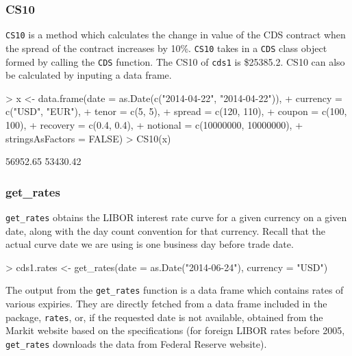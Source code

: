 \documentclass{jss}
\renewenvironment{Schunk}{\vspace{\topsep}}{\vspace{\topsep}}
\begin{document}
\subsubsection{CS10}


\texttt{CS10} is a method which calculates the change in value of the CDS contract when the spread of the contract increases by 10\%. \texttt{CS10} takes in a \texttt{CDS} class object formed by calling the \texttt{CDS} function. The CS10 of \texttt{cds1} is \$25385.2. CS10 can also be calculated by inputing a data frame. 

\begin{Schunk}
\begin{Sinput}
> x <- data.frame(date = as.Date(c("2014-04-22", "2014-04-22")),
+                 currency = c("USD", "EUR"),
+                 tenor = c(5, 5),
+                 spread = c(120, 110),
+                 coupon = c(100, 100),
+                 recovery = c(0.4, 0.4),
+                 notional = c(10000000, 10000000),
+                 stringsAsFactors = FALSE)
> CS10(x)
\end{Sinput}
\begin{Soutput}
[1] 56952.65 53430.42
\end{Soutput}
\end{Schunk}

\subsubsection{get\_rates}


\texttt{get\_rates} obtains the LIBOR interest rate curve for a given currency on a given date, along with the day count convention for that currency. Recall that the actual curve date we are using is one business day before trade date. 

\begin{Schunk}
\begin{Sinput}
> cds1.rates <- get_rates(date = as.Date("2014-06-24"), currency = "USD")
\end{Sinput}
\end{Schunk}

The output from the \texttt{get\_rates} function is a data frame which contains rates of various expiries. They are directly fetched from a data frame included in the package, \texttt{rates}, or, if the requested date is not available, obtained from the Markit website based on the specifications \citep{rates} (for foreign LIBOR rates before 2005, \texttt{get\_rates} downloads the data from Federal Reserve website).
\end{document}
